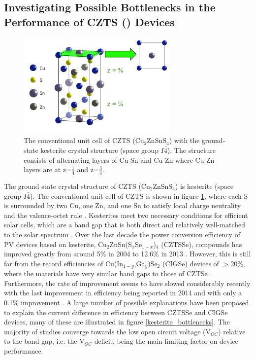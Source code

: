 \subsection{Investigating Possible Bottlenecks in the Performance of CZTS (\CZTS) Devices}

\begin{figure}[h!]
  \centering
    \includegraphics[width=0.7\textwidth]{figures/CZTS_cell.png}
    \caption{The conventional unit cell of CZTS (Cu$_{2}$ZnSnS$_{4}$) with the ground-state kesterite crystal structure (space group $I\bar{4}$). The structure consists of alternating layers of Cu-Sn and Cu-Zn where Cu-Zn layers are at z=$\frac{1}{4}$ and z=$\frac{3}{4}$.}
  \label{CZTS_cell}
\end{figure}

The ground state crystal structure of CZTS (Cu$_{2}$ZnSnS$_{4}$) is kesterite (space group $I\bar{4}$). The conventional unit cell of CZTS is shown in figure \ref{CZTS_cell}, where each S is surrounded by two Cu, one Zn, and one Sn to satisfy local charge neutrality and the valence-octet rule \cite{jonathan_5}.
Kesterites meet two necessary conditions for efficient solar cells, which are a band gap that is both direct and relatively well-matched to the solar spectrum \cite{CZTS_book}.
Over the last decade the power conversion efficiency of PV devices based on kesterite, Cu$_2$ZnSn(S$_x$Se$_{1-x}$)$_4$ (CZTSSe), compounds has improved greatly from around 5\% in 2004 to 12.6\% in 2013 \cite{culprit_2}. However, this is still far from the record efficiencies of Cu(In$_{1-y}$,Ga$_y$)Se$_2$ (CIGSe) devices of $>$20\%, where the materials have very similar band gaps to those of CZTSe \cite{culprit}. Furthermore, the rate of improvement seems to have slowed considerably recently with the last improvement in efficiency being reported in 2014 and with only a 0.1\% improvement \cite{culprit_3}. A large number of possible explanations have been proposed to explain the current difference in efficiency between CZTSSe and CIGSe devices, many of these are illustrated in figure \ref{kesterite_bottlenecks}. The majority of studies converge towards the low open circuit voltage (V$_{OC}$) relative to the band gap, i.e. the V$_{OC}$ deficit, being the main limiting factor on device performance. \\

